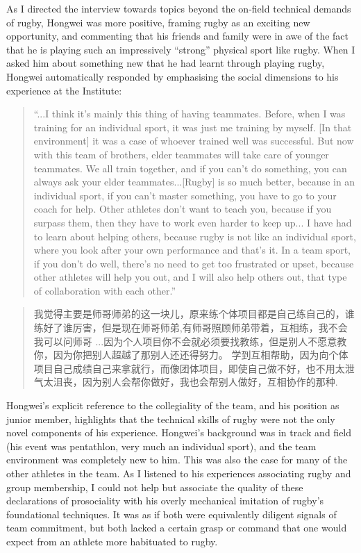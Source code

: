 \begin{CJK}{UTF8}{gbsn}
As I directed the interview towards topics beyond the on-field technical demands of rugby, Hongwei was more positive, framing rugby as an exciting new opportunity, and commenting that his friends and family were in awe of the fact that he is playing such an impressively ``strong'' physical sport like rugby.  When I asked him about something new that he had learnt through playing rugby, Hongwei automatically responded by emphasising the social dimensions to his experience at the Institute:

  \begin{quotation}
    ``...I think it's mainly this thing of having teammates. Before, when I was training for an individual sport, it was just me training by myself. [In that environment] it was a case of whoever trained well was successful.  But now with this team of brothers, elder teammates will take care of younger teammates. We all train together, and if you can’t do something, you can always ask your elder teammates...[Rugby] is so much better, because in an individual sport, if you can't master something, you have to go to your coach for help. Other athletes don't want to teach you, because if you surpass them, then they have to work even harder to keep up... I have had to learn about helping others, because rugby is not like an individual sport, where you look after your own performance and that's it.  In a team sport, if you don't do well, there's no need to get too frustrated or upset, because other athletes will help you out, and I will also help others out, that type of collaboration with each other.''
  \end{quotation}

\begin{CJK}{UTF8}{gbsn}
  \begin{quotation}
    我觉得主要是师哥师弟的这一块儿，原来练个体项目都是自己练自己的，谁练好了谁厉害，但是现在师哥师弟,有师哥照顾师弟带着，互相练，我不会我可以问师哥
    ...因为个人项目你不会就必须要找教练，但是别人不愿意教你，因为你把别人超越了那别人还还得努力。 学到互相帮助，因为向个体项目自己成绩自己来拿就行，而像团体项目，即使自己做不好，也不用太泄气太沮丧，因为别人会帮你做好，我也会帮别人做好，互相协作的那种.
  \end{quotation}
\end{CJK}

Hongwei's explicit reference to the collegiality of the team, and his position as junior member, highlights that the technical skills of rugby were not the only novel components of his experience.  Hongwei's background was in track and field (his event was pentathlon, very much an individual sport), and the team environment was completely new to him.  This was also the case for many of the other athletes in the team.  As I listened to his experiences associating rugby and group membership, I could not help but associate the quality of these declarations of prosociality with his overly mechanical imitation of rugby's foundational techniques.  It was as if both were equivalently diligent signals of team commitment, but both lacked a certain grasp or command that one would expect from an athlete more habituated to rugby.


\end{CJK}
